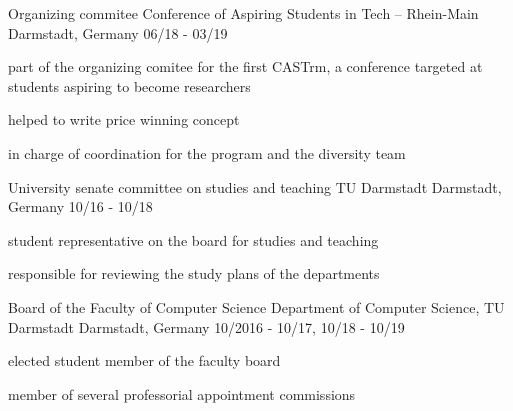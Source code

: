 

\begin{cventries}

  \cventry
    {Organizing commitee} %
    {Conference of Aspiring Students in Tech -- Rhein-Main} %
    {Darmstadt, Germany} %
    {06/18 - 03/19} %
    {
      \begin{cvitems} %
        \item {part of the organizing comitee for the first CASTrm, a conference targeted at students aspiring to become researchers}
        \item {helped to write price winning concept}
        \item {in charge of coordination for the program and the diversity team}
      \end{cvitems}
    }

  \cventry
    {University senate committee on studies and teaching} %
    {TU Darmstadt} %
    {Darmstadt, Germany} %
    {10/16 - 10/18} %
    {
      \begin{cvitems} %
        \item {student representative on the board for studies and teaching}
        \item {responsible for reviewing the study plans of the departments}
      \end{cvitems}
    }

  \cventry
    {Board of the Faculty of Computer Science} %
    {Department of Computer Science, TU Darmstadt} %
    {Darmstadt, Germany} %
    {10/2016 - 10/17, 10/18 - 10/19} %
    {
      \begin{cvitems} %
        \item {elected student member of the faculty board}
        \item {member of several professorial appointment commissions}
      \end{cvitems}
    }


\end{cventries}
